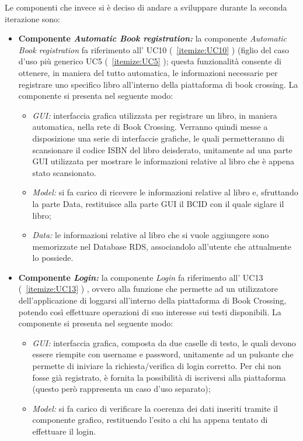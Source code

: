 Le componenti che invece si è deciso di andare a sviluppare durante la seconda iterazione sono: 
\begin{itemize}
	\item \textbf{Componente \textit{Automatic Book registration:}} la componente \textit{Automatic Book registration} fa riferimento all’ UC10
	(~\ref{itemize:UC10} )
	(figlio del caso d'uso più generico UC5 
	(~\ref{itemize:UC5} );
	questa funzionalità consente di ottenere, in maniera del tutto automatica, le informazioni necessarie per registrare uno specifico libro all'interno della piattaforma di book crossing. La componente si presenta nel seguente modo:
	\begin{itemize}
		\item \textit{GUI:} interfaccia grafica utilizzata per registrare un libro, in maniera automatica, nella rete di Book Crossing. Verranno quindi messe a disposizione una serie di interfaccie grafiche, le quali permetteranno di scansionare il codice ISBN del libro deisderato, unitamente ad una parte GUI utilizzata per mostrare le informazioni relative al libro che è appena stato scansionato.
		\item \textit{Model:} si fa carico di ricevere le informazioni relative al libro e, sfruttando la parte Data, restituisce alla parte GUI il BCID con il quale siglare il libro;
		\item \textit{Data:} le informazioni relative al libro che si vuole aggiungere sono memorizzate nel Database RDS, associandolo all'utente che attualmente lo possiede. 
	\end{itemize}
	\item \textbf{Componente \textit{Login:}}  la componente \textit{Login} fa riferimento all’ UC13 
	(~\ref{itemize:UC13} )
	, ovvero alla funzione che permette ad un utilizzatore dell'applicazione di loggarsi all'interno della piattaforma di Book Crossing, potendo così effettuare operazioni di suo interesse sui testi disponibili.
	La componente si presenta nel seguente modo:
	\begin{itemize}
		\item \textit{GUI:} interfaccia grafica, composta da due caselle di testo, le quali devono essere riempite con username e password, unitamente ad un pulsante che permette di iniviare la richiesta/verifica di login corretto. Per chi non fosse già registrato, è fornita la possibilità di iscriversi alla piattaforma (questo però rappresenta un caso d'uso separato);
		\item \textit{Model:} si fa carico di verificare la coerenza dei dati inseriti tramite il componente grafico, restituendo l'esito a chi ha appena tentato di effettuare il login.

\end{itemize}
\end{itemize}
